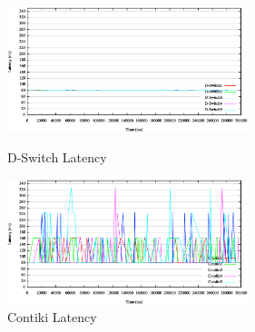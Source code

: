 \begin{figure}[htbp]
 \begin{minipage}{0.5\hsize} \begin{center}
     \includegraphics[width=70mm]{./images/d-switch_latency.eps}
    \end{center}
    \caption{D-Switch Latency}
    \label{fig:d-switch_latency}
 \end{minipage}
 \begin{minipage}{0.5\hsize}
    \begin{center}
     \includegraphics[width=70mm]{./images/contiki_latency.eps}
    \end{center}
    \caption{Contiki Latency}
    \label{fig:contiki_latency}
 \end{minipage}
\end{figure}





